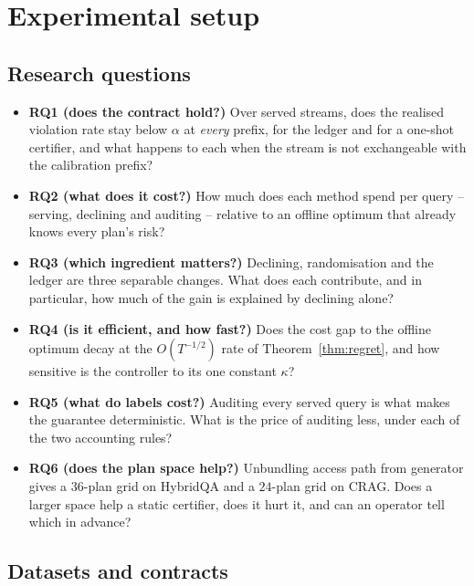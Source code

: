 \section{Experimental setup}
\label{sec:setup}

\subsection{Research questions}
\label{sec:rqs}

\begin{itemize}
\item \textbf{RQ1 (does the contract hold?)} Over served streams, does
the realised violation rate stay below $\alpha$ at \emph{every} prefix,
for the ledger and for a one-shot certifier, and what happens to each
when the stream is not exchangeable with the calibration prefix?
\item \textbf{RQ2 (what does it cost?)} How much does each method spend
per query -- serving, declining and auditing -- relative to an offline
optimum that already knows every plan's risk?
\item \textbf{RQ3 (which ingredient matters?)} Declining, randomisation
and the ledger are three separable changes. What does each contribute,
and in particular, how much of the gain is explained by declining alone?
\item \textbf{RQ4 (is it efficient, and how fast?)} Does the cost gap to
the offline optimum decay at the $O(T^{-1/2})$ rate of
Theorem~\ref{thm:regret}, and how sensitive is the controller to its one
constant $\kappa$?
\item \textbf{RQ5 (what do labels cost?)} Auditing every served query is
what makes the guarantee deterministic. What is the price of auditing
less, under each of the two accounting rules?
\item \textbf{RQ6 (does the plan space help?)} Unbundling access path
from generator gives a $36$-plan grid on HybridQA and a $24$-plan grid
on CRAG. Does a larger space help a static certifier, does it hurt it,
and can an operator tell which in advance?
\end{itemize}

\subsection{Datasets and contracts}
\label{sec:datasets}

